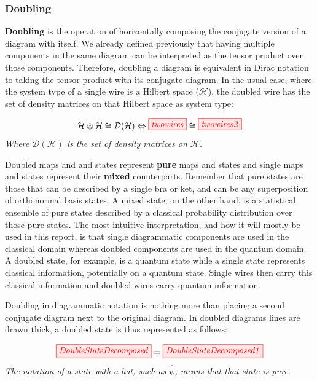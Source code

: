 \documentclass[]{article}
\begin{document}
\subsubsection{Doubling}
\label{doubling}

\textbf{Doubling} is the operation of horizontally composing the conjugate version of a diagram with itself. We already defined previously that having multiple components in the same diagram can be interpreted as the tensor product over those components. Therefore, doubling a diagram is equivalent in Dirac notation to taking the tensor product with its conjugate diagram. In the usual case, where the system type of a single wire is a Hilbert space ($\mathcal{H}$), the doubled wire has the set of density matrices on that Hilbert space as system type:

\begin{equation}
\mathcal{H} \otimes \mathcal{H} \cong \mathcal{D}(\mathcal{H}) \Leftrightarrow \tikzfig{twowires} \cong \tikzfig{twowires2}
\end{equation}
\textit{Where $\mathcal{D}(\mathcal{H})$ is the set of density matrices on $\mathcal{H}$.}

Doubled maps and and states represent \textbf{pure} maps and states and single maps and states represent their \textbf{mixed} counterparts. Remember that pure states are those that can be described by a single bra or ket, and can be any superposition of orthonormal basis states. A mixed state, on the other hand, is a statistical ensemble of pure states described by a classical probability distribution over those pure states. The most intuitive interpretation, and how it will mostly be used in this report, is that single diagrammatic components are used in the classical domain whereas doubled components are used in the quantum domain. A doubled state, for example, is a quantum state while a single state represents classical information, potentially on a quantum state. Single wires then carry this classical information and doubled wires carry quantum information.

Doubling in diagrammatic notation is nothing more than placing a second conjugate diagram
next to the original diagram. In doubled diagrams lines are drawn thick, a doubled state is thus
represented as follows:

\begin{equation}
	\label{equation:doubledstate}
	\tikzfig{DoubleStateDecomposed} \equiv \tikzfig{DoubleStateDecomposed1}
\end{equation}
\textit{The notation of a state with a hat, such as $\hat{\psi}$, means that that state is pure.}
\end{document}
